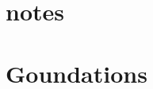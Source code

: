 \documentclass[UTF8,a4paper,12pt]{ctexart}
\begin{document}
    \pagestyle{plain}
    \section*{\huge{notes}}
    \section{Goundations}
\end{document}

